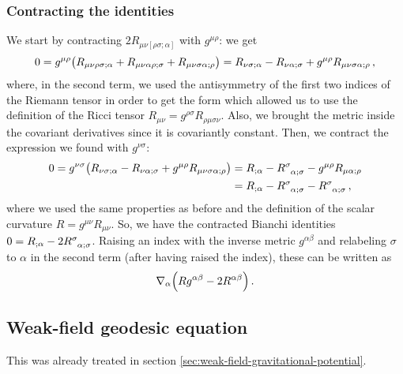 \documentclass[main.tex]{subfiles}
\begin{document}
\subsubsection{Contracting the identities}

We start by contracting \(2 R_{\mu \nu [ \rho \sigma ; \alpha ]}\) with \(g^{\mu \rho }\): we get 
%
\begin{align}
    0=
  g^{\mu \rho } \qty(R_{\mu \nu \rho \sigma ; \alpha } + R_{\mu \nu \alpha \rho ; \sigma } + R_{\mu \nu \sigma \alpha ; \rho }) = R_{\nu \sigma ; \alpha } - R_{\nu \alpha ; \sigma } + g^{\mu \rho } R_{\mu \nu \sigma \alpha ; \rho }
\,,
\end{align}
%
where, in the second term, we used the antisymmetry of the first two indices of the Riemann tensor in order to get the form which allowed us to use the definition of the Ricci tensor \(R_{\mu \nu } = g^{\rho \sigma } R_{\rho \mu \sigma \nu }\).
Also, we brought the metric inside the covariant derivatives since it is covariantly constant.
Then, we contract the expression we found with \(g^{\nu \sigma }\): 
%
\begin{align} 
  0=
  g^{\nu \sigma } \qty(R_{\nu \sigma ; \alpha } - R_{\nu \alpha ; \sigma } + g^{\mu \rho } R_{\mu \nu \sigma \alpha ; \rho })
  &= R_{;\alpha  } - \tensor{R}{^{\sigma }_{\alpha; \sigma  }} - g^{\mu \rho} R_{\mu \alpha ; \rho }  \\
  &= R_{;\alpha  } - \tensor{R}{^{\sigma }_{\alpha; \sigma  }} - \tensor{R}{^{\sigma }_{\alpha ; \sigma }}
\,,
\end{align}
%
where we used the same properties as before and the definition of the scalar curvature \(R = g^{\mu \nu }R_{\mu \nu }\). So, we have the contracted Bianchi identities \(0 = R_{;\alpha } - 2 \tensor{R}{^{\sigma }_{\alpha ; \sigma }}\).
Raising an index with the inverse metric \(g^{\alpha \beta }\) and relabeling \(\sigma \) to \(\alpha \) in the second term (after having raised the index), these can be written as 
%
\begin{align}
  \nabla_{\alpha } \qty(R g^{\alpha \beta } - 2R^{\alpha \beta })
\,.
\end{align}
%

\subsection{Weak-field geodesic equation}

This was already treated in section \ref{sec:weak-field-gravitational-potential}.
\end{document}
